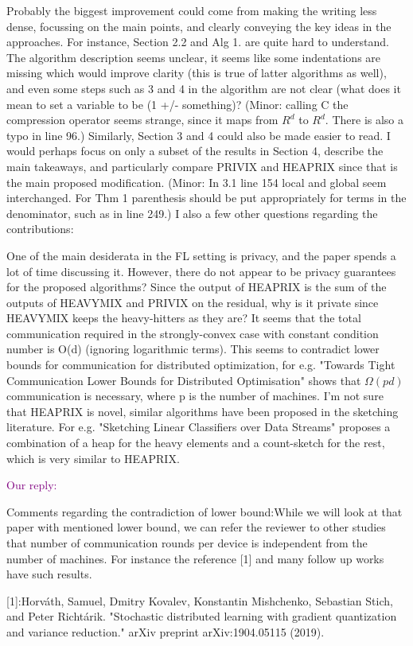 \documentclass{article}
\begin{document}
Probably the biggest improvement could come from making the writing less dense, focussing on the main points, and clearly conveying the key ideas in the approaches. For instance, Section 2.2 and Alg 1. are quite hard to understand. The algorithm description seems unclear, it seems like some indentations are missing which would improve clarity (this is true of latter algorithms as well), and even some steps such as 3 and 4 in the algorithm are not clear (what does it mean to set a variable to be (1 +/- something)? (Minor: calling C the compression operator seems strange, since it maps from $R^d$ to $R^d$. There is also a typo in line 96.)
Similarly, Section 3 and 4 could also be made easier to read. I would perhaps focus on only a subset of the results in Section 4, describe the main takeaways, and particularly compare PRIVIX and HEAPRIX since that is the main proposed modification. (Minor: In 3.1 line 154 local and global seem interchanged. For Thm 1 parenthesis should be put appropriately for terms in the denominator, such as in line 249.)
I also a few other questions regarding the contributions:

One of the main desiderata in the FL setting is privacy, and the paper spends a lot of time discussing it. However, there do not appear to be privacy guarantees for the proposed algorithms? Since the output of HEAPRIX is the sum of the outputs of HEAVYMIX and PRIVIX on the residual, why is it private since HEAVYMIX keeps the heavy-hitters as they are?
It seems that the total communication required in the strongly-convex case with constant condition number is O(d) (ignoring logarithmic terms). This seems to contradict lower bounds for communication for distributed optimization, for e.g. "Towards Tight Communication Lower Bounds for Distributed Optimisation" shows that $\Omega(pd)$ communication is necessary, where p is the number of machines.
I'm not sure that HEAPRIX is novel, similar algorithms have been proposed in the sketching literature. For e.g. "Sketching Linear Classifiers over Data Streams" proposes a combination of a heap for the heavy elements and a count-sketch for the rest, which is very similar to HEAPRIX.

\textcolor{purple}{Our reply:}

{\color{blue} Comments regarding the contradiction of lower bound:While we will look at that paper with mentioned lower bound, we can refer the reviewer to other studies that number of communication rounds per device is independent from the number of machines. For instance the reference [1] and many follow up works have such results.

[1]:Horváth, Samuel, Dmitry Kovalev, Konstantin Mishchenko, Sebastian Stich, and Peter Richtárik. "Stochastic distributed learning with gradient quantization and variance reduction." arXiv preprint arXiv:1904.05115 (2019).
}
\end{document}
